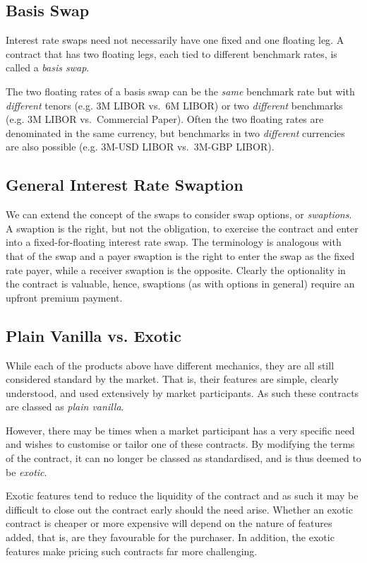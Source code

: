 \subsection{Basis Swap}
Interest rate swaps need not necessarily have one fixed and one floating leg. A contract that has two floating legs, each tied to different benchmark rates, is called a \textit{basis swap}.

The two floating rates of a basis swap can be the \textit{same} benchmark rate but with \textit{different} tenors (e.g. 3M LIBOR vs.\ 6M LIBOR) or two \textit{different} benchmarks (e.g. 3M LIBOR vs.\ Commercial Paper). Often the two floating rates are denominated in the same currency, but benchmarks in two \textit{different} currencies are also possible (e.g. 3M-USD LIBOR vs.\ 3M-GBP LIBOR).

\subsection{General Interest Rate Swaption}
We can extend the concept of the swaps to consider swap options, or \textit{swaptions}. A swaption is the right, but not the obligation, to exercise the contract and enter into a fixed-for-floating interest rate swap. The terminology is analogous with that of the swap and a payer swaption is the right to enter the swap as the fixed rate payer, while a receiver swaption is the opposite. Clearly the optionality in the contract is valuable, hence, swaptions (as with options in general) require an upfront premium payment.

\subsection{Plain Vanilla vs. Exotic}
While each of the products above have different mechanics, they are all still considered standard by the market. That is, their features are simple, clearly understood, and used extensively by market participants. As such these contracts are classed as \textit{plain vanilla}. 

However, there may be times when a market participant has a very specific need and wishes to customise or tailor one of these contracts. By modifying the terms of the contract, it can no longer be classed as standardised, and is thus deemed to be \textit{exotic}.

Exotic features tend to reduce the liquidity of the contract and as such it may be difficult to close out the contract early should the need arise. Whether an exotic contract is cheaper or more expensive will depend on the nature of features added, that is, are they favourable for the purchaser. In addition, the exotic features make pricing such contracts far more challenging. 

